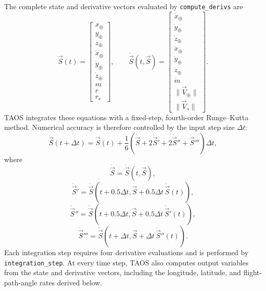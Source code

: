 The complete state and derivative vectors evaluated by \texttt{compute\_derivs} are
\begin{equation}
  \vec S(t)
  =\begin{bmatrix}
    x_{\oplus}\\y_{\oplus}\\z_{\oplus}\\
    \dot x_{\oplus}\\\dot y_{\oplus}\\\dot z_{\oplus}\\
    m\\r\\r_s
  \end{bmatrix},
  \qquad
  \dot{\vec S}(t,\vec S)
  =\begin{bmatrix}
    \dot x_{\oplus}\\\dot y_{\oplus}\\\dot z_{\oplus}\\
    \ddot x_{\oplus}\\\ddot y_{\oplus}\\\ddot z_{\oplus}\\
    \dot m\\
    \lVert\vec V_{\oplus}\rVert\\
    \lVert\vec V_s\rVert
  \end{bmatrix}.
  \label{eq:augmented-trajectory-state}
\end{equation}
TAOS integrates these equations with a fixed-step, fourth-order Runge--Kutta
method. Numerical accuracy is therefore controlled by the input step size
$\Delta t$:
\begin{equation}
  \vec S(t+\Delta t)
  =\vec S(t)
   +\frac{1}{6}
    \left(
      \dot{\vec S}
      +2\dot{\vec S}'
      +2\dot{\vec S}''
      +\dot{\vec S}'''
    \right)\Delta t,
  \label{eq:runge-kutta-fourth-order-step}
\end{equation}
where
\begin{equation}
  \dot{\vec S}=\dot{\vec S}(t,\vec S),
  \label{eq:runge-kutta-stage-zero}
\end{equation}
\begin{equation}
  \dot{\vec S}'
  =\dot{\vec S}
    \left(
      t+0.5\Delta t,
      \vec S+0.5\Delta t\,\dot{\vec S}(t)
    \right),
  \label{eq:runge-kutta-stage-one}
\end{equation}
\begin{equation}
  \dot{\vec S}''
  =\dot{\vec S}
    \left(
      t+0.5\Delta t,
      \vec S+0.5\Delta t\,\dot{\vec S}'(t)
    \right),
  \label{eq:runge-kutta-stage-two}
\end{equation}
\begin{equation}
  \dot{\vec S}'''
  =\dot{\vec S}
    \left(
      t+\Delta t,
      \vec S+\Delta t\,\dot{\vec S}''(t)
    \right).
  \label{eq:runge-kutta-stage-three}
\end{equation}
Each integration step requires four derivative evaluations and is performed by
\texttt{integration\_step}. At every time step, TAOS also computes output variables
from the state and derivative vectors, including the longitude, latitude, and
flight-path-angle rates derived below.
